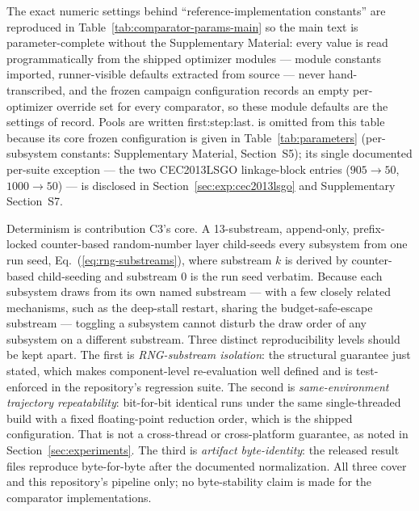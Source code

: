The exact numeric settings behind ``reference-implementation constants'' are reproduced
in Table~\ref{tab:comparator-params-main} so the main text is
parameter-complete without the Supplementary Material: every value is
read programmatically from the shipped optimizer modules --- module
constants imported, runner-visible defaults extracted from source ---
never hand-transcribed, and the frozen campaign configuration records an
empty per-optimizer override set for every comparator, so these module
defaults are the settings of record. Pools are written first:step:last.
\dtgsk{} is omitted from this table because its core frozen
configuration is given in Table~\ref{tab:parameters} (per-subsystem
constants: Supplementary Material, Section~S5); its single
documented per-suite exception --- the two CEC2013LSGO linkage-block
entries ($905 \to 50$, $1000 \to 50$) --- is disclosed in
Section~\ref{sec:exp:cec2013lsgo} and Supplementary Section~S7.
\begin{table}[H]
\caption{GSK-family comparator parameter settings exactly as run in this
study, read from the shipped optimizer modules. Identical settings apply
on all five suites; no comparator is tuned per suite. Bracketed lists are
per-arm pools; ranges are written first:step:last.}\label{tab:comparator-params-main}
\centering
\tablesize{\footnotesize}
\resizebox{\textwidth}{!}{}
\end{table}

Determinism is contribution C3's core.
A 13-substream, append-only, prefix-locked counter-based random-number
layer child-seeds every subsystem from one run seed,
Eq.~(\ref{eq:rng-substreams}), where substream $k$ is derived by
counter-based child-seeding and substream 0 is the run seed
verbatim. %
Because each subsystem draws from its own named substream --- with a
few closely related mechanisms, such as the deep-stall restart, sharing
the budget-safe-escape substream --- toggling a subsystem cannot
disturb the draw order of any subsystem on a different substream. Three
distinct reproducibility levels should be kept apart. The first is
\emph{RNG-substream isolation}: the structural guarantee just stated, which
makes component-level re-evaluation well defined and is test-enforced in the
repository's regression suite. The second is \emph{same-environment trajectory
repeatability}: bit-for-bit identical runs under the same single-threaded
build with a fixed floating-point reduction order, which is the shipped
configuration. That is not a cross-thread or cross-platform guarantee, as noted
in Section~\ref{sec:experiments}. The third is \emph{artifact byte-identity}:
the released result files reproduce byte-for-byte after the documented
normalization. All three cover \dtgsk{} and this repository's pipeline only;
no byte-stability claim is made for the comparator implementations.

